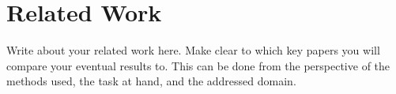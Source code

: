 \section{Related Work}
\label{sec:related_work}
Write about your related work here. Make clear to which key papers you will compare your eventual results to. This can be done from the perspective of the methods used, the task at hand, and the addressed domain.

